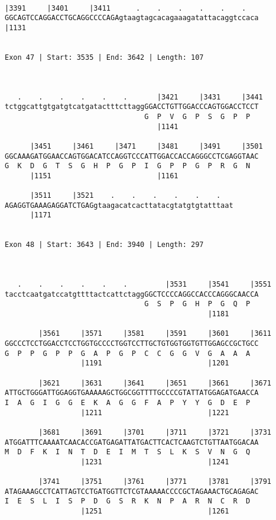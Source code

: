 \documentclass{article}
\begin{document}
\begin{Verbatim}
  
|3391     |3401     |3411      .    .    .    .    .    .   
GGCAGTCCAGGACCTGCAGGCCCCAGAgtaagtagcacagaaagatattacaggtccaca
|1131                                                       
  
 
Exon 47 | Start: 3535 | End: 3642 | Length: 107



   .    .    .    .    .    .       |3421     |3431     |3441
tctggcattgtgatgtcatgatactttcttaggGGACCTGTTGGACCCAGTGGACCTCCT
                                 G  P  V  G  P  S  G  P  P  
                                    |1141                   
  
      |3451     |3461     |3471     |3481     |3491     |3501
GGCAAAGATGGAACCAGTGGACATCCAGGTCCCATTGGACCACCAGGGCCTCGAGGTAAC
G  K  D  G  T  S  G  H  P  G  P  I  G  P  P  G  P  R  G  N  
      |1151                         |1161                   
  
      |3511     |3521    .    .    .    .    .    .   
AGAGGTGAAAGAGGATCTGAGgtaagacatcacttatacgtatgtgtatttaat
      |1171                                           
  
 
Exon 48 | Start: 3643 | End: 3940 | Length: 297



   .    .    .    .    .    .         |3531     |3541     |3551
tacctcaatgatccatgttttactcattctaggGGCTCCCCAGGCCACCCAGGGCAACCA
                                 G  S  P  G  H  P  G  Q  P  
                                                |1181       
  
        |3561     |3571     |3581     |3591     |3601     |3611
GGCCCTCCTGGACCTCCTGGTGCCCCTGGTCCTTGCTGTGGTGGTGTTGGAGCCGCTGCC
G  P  P  G  P  P  G  A  P  G  P  C  C  G  G  V  G  A  A  A  
                  |1191                         |1201       
  
        |3621     |3631     |3641     |3651     |3661     |3671
ATTGCTGGGATTGGAGGTGAAAAAGCTGGCGGTTTTGCCCCGTATTATGGAGATGAACCA
I  A  G  I  G  G  E  K  A  G  G  F  A  P  Y  Y  G  D  E  P  
                  |1211                         |1221       
  
        |3681     |3691     |3701     |3711     |3721     |3731
ATGGATTTCAAAATCAACACCGATGAGATTATGACTTCACTCAAGTCTGTTAATGGACAA
M  D  F  K  I  N  T  D  E  I  M  T  S  L  K  S  V  N  G  Q  
                  |1231                         |1241       
  
        |3741     |3751     |3761     |3771     |3781     |3791
ATAGAAAGCCTCATTAGTCCTGATGGTTCTCGTAAAAACCCCGCTAGAAACTGCAGAGAC
I  E  S  L  I  S  P  D  G  S  R  K  N  P  A  R  N  C  R  D  
                  |1251                         |1261       
  

\end{Verbatim}
\end{document}
